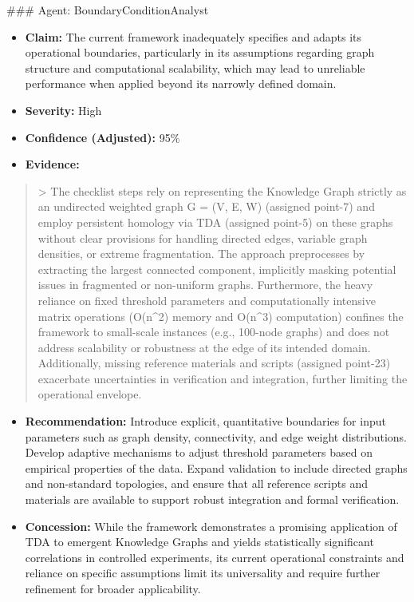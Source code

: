\documentclass[12pt]{article}
\begin{document}
\hrulefill
\#\#\# Agent: BoundaryConditionAnalyst
\begin{itemize}
  \item \textbf{Claim:} The current framework inadequately specifies and adapts its operational boundaries, particularly in its assumptions regarding graph structure and computational scalability, which may lead to unreliable performance when applied beyond its narrowly defined domain.
  \item \textbf{Severity:} High
  \item \textbf{Confidence (Adjusted):} 95\%
  \item \textbf{Evidence:}
\end{itemize}
\begin{quote}
> The checklist steps rely on representing the Knowledge Graph strictly as an undirected weighted graph G = (V, E, W) (assigned point-7) and employ persistent homology via TDA (assigned point-5) on these graphs without clear provisions for handling directed edges, variable graph densities, or extreme fragmentation. The approach preprocesses by extracting the largest connected component, implicitly masking potential issues in fragmented or non-uniform graphs. Furthermore, the heavy reliance on fixed threshold parameters and computationally intensive matrix operations (O(n\^{}2) memory and O(n\^{}3) computation) confines the framework to small-scale instances (e.g., 100-node graphs) and does not address scalability or robustness at the edge of its intended domain. Additionally, missing reference materials and scripts (assigned point-23) exacerbate uncertainties in verification and integration, further limiting the operational envelope.
\end{quote}
\begin{itemize}
  \item \textbf{Recommendation:} Introduce explicit, quantitative boundaries for input parameters such as graph density, connectivity, and edge weight distributions. Develop adaptive mechanisms to adjust threshold parameters based on empirical properties of the data. Expand validation to include directed graphs and non-standard topologies, and ensure that all reference scripts and materials are available to support robust integration and formal verification.
  \item \textbf{Concession:} While the framework demonstrates a promising application of TDA to emergent Knowledge Graphs and yields statistically significant correlations in controlled experiments, its current operational constraints and reliance on specific assumptions limit its universality and require further refinement for broader applicability.
\end{itemize}
\end{document}
